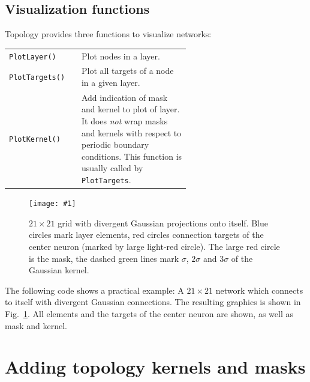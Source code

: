 \documentclass[a4paper,12pt]{report}
\newcommand{\scriptfig}[4]{%
\begin{figure}
\centerline{\texttt{[image: \#1]}}
\caption[#3]{#4}
\label{fig:#1}
\end{figure}%
}
\begin{document}
\section{Visualization functions}\label{sec:visualize}

Topology provides three functions to visualize networks:
\begin{longtable}{lp{0.6\linewidth}}
\lstinline!PlotLayer()!
&
    Plot nodes in a layer.\\
\lstinline!PlotTargets()!
&
    Plot all targets of a node in a given layer.\\
\lstinline!PlotKernel()!
&
    Add indication of mask and kernel to plot of layer. It
    does \emph{not} wrap masks and kernels with respect to periodic
    boundary conditions. This function
    is usually called by \lstinline!PlotTargets!.
\end{longtable}

\scriptfig{vislayer}{0.7}{Example of layer visualization.}%
{$21\times21$ grid with divergent Gaussian projections onto itself.
Blue circles mark layer elements, red circles connection targets of
the center neuron (marked by large light-red circle). The large red
circle is the mask, the dashed green lines mark $\sigma$, $2\sigma$
and $3\sigma$ of the Gaussian kernel.}

The following code shows a practical example: A $21\times21$ network
which connects to itself with divergent Gaussian connections. The
resulting graphics is shown in Fig.~\ref{fig:vislayer}. All
elements and the targets of the center neuron are shown, as well as
mask and kernel.
%



\chapter{Adding topology kernels and masks}\label{ch:extending}
\end{document}
